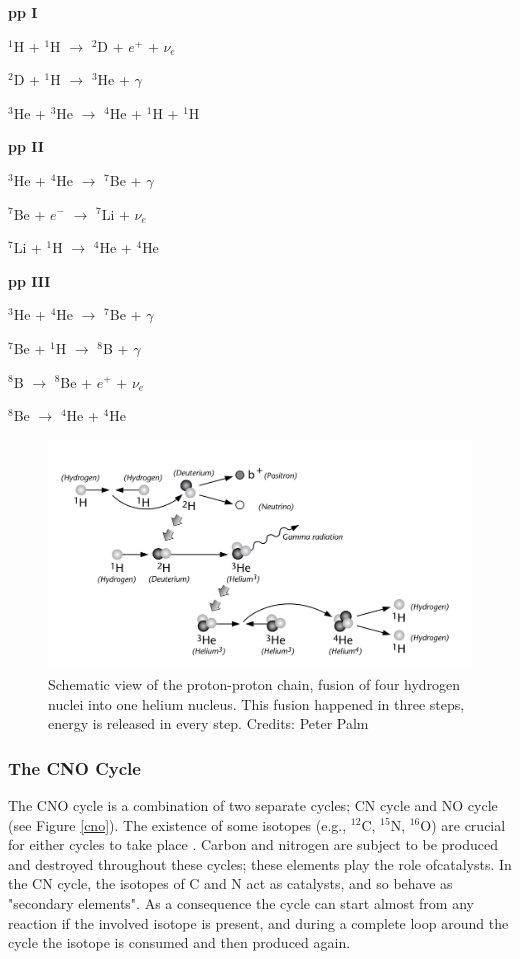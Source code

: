 \textbf{pp I}

$^{1}$H + $^{1}$H $\longrightarrow$ $^{2}$D + $e^{+}$ +
$\nu_{e}$


$^{2}$D + $^{1}$H $\longrightarrow$ $^{3}$He + $\gamma$

$^{3}$He + $^{3}$He $\longrightarrow$ $^{4}$He + $^{1}$H +
$^{1}$H

\textbf{pp II}

$^{3}$He + $^{4}$He $\longrightarrow$ $^{7}$Be + $\gamma$


$^{7}$Be + $e^{-}$ $\longrightarrow$ $^{7}$Li + $\nu_{e}$


$^{7}$Li + $^{1}$H $\longrightarrow$ $^{4}$He + $^{4}$He

\textbf{pp III}

$^{3}$He + $^{4}$He $\longrightarrow$ $^{7}$Be + $\gamma$

$^{7}$Be + $^{1}$H $\longrightarrow$ $^{8}$B + $\gamma$

$^{8}$B $\longrightarrow$ $^{8}$Be + $e^{+}$ + $\nu_{e}$


$^{8}$Be $\longrightarrow$ $^{4}$He + $^{4}$He


\begin{figure}[!ht]
\centering
\includegraphics[width=\textwidth, angle=0]{Img/ppchain.png}
\caption{Schematic view of the proton-proton chain, fusion of four hydrogen nuclei into one helium nucleus. This fusion happened in three steps, energy is released in every step. Credits: Peter Palm} 
\label{ppchain}
\end{figure}



\subsubsection{The CNO Cycle}
The CNO cycle is a combination of two separate cycles; CN cycle and NO cycle (see Figure \ref{cno}). The existence of some isotopes (e.g., $^{12}$C, $^{15}$N, $^{16}$O) are crucial for either cycles to take place \citep[see below the reaction networks involved in this process,][]{2018PhP....20..124W}. Carbon and nitrogen are subject to be produced and destroyed throughout these cycles; these elements play the role ofcatalysts. In the CN cycle, the isotopes of C and N act as catalysts, and so behave as "secondary elements". As a consequence the cycle can start almost from any reaction if the involved isotope is present, and during a complete loop around the cycle the isotope is consumed and then produced again.

